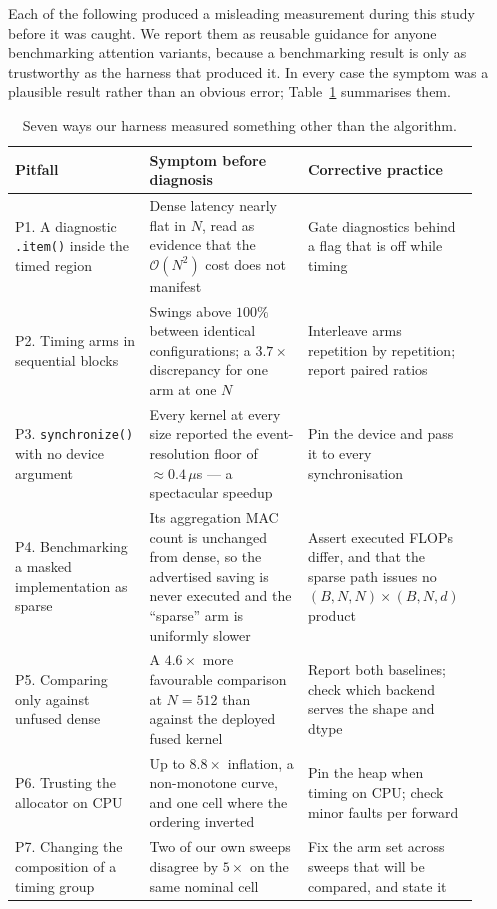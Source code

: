 Each of the following produced a misleading measurement during this study
before it was
caught. We report them as reusable guidance for anyone benchmarking attention
variants, because a benchmarking result is only as trustworthy as the harness
that produced it. In every case the symptom was a plausible result rather than
an obvious error; Table~\ref{tab:pitfalls} summarises them.

\begin{table}[t]
\centering
\small
\caption{Seven ways our harness measured something other than the algorithm.}
\label{tab:pitfalls}
\begin{tabular}{p{0.29\linewidth}p{0.33\linewidth}p{0.30\linewidth}}
\toprule
\textbf{Pitfall} & \textbf{Symptom before diagnosis} & \textbf{Corrective practice} \\
\midrule
P1. A diagnostic \texttt{.item()} inside the timed region &
Dense latency nearly flat in $N$, read as evidence that the
$\mathcal{O}(N^2)$ cost does not manifest &
Gate diagnostics behind a flag that is off while timing \\
\addlinespace
P2. Timing arms in sequential blocks &
Swings above $100\%$ between identical configurations; a $3.7\times$
discrepancy for one arm at one $N$ &
Interleave arms repetition by repetition; report paired ratios \\
\addlinespace
P3. \texttt{synchronize()} with no device argument &
Every kernel at every size reported the event-resolution floor of
$\approx0.4\,\mu$s --- a spectacular speedup &
Pin the device and pass it to every synchronisation \\
\addlinespace
P4. Benchmarking a masked implementation as sparse &
Its aggregation MAC count is unchanged from dense, so the advertised saving is
never executed and the ``sparse'' arm is uniformly slower &
Assert executed FLOPs differ, and that the sparse path issues no
$(B,N,N)\times(B,N,d)$ product \\
\addlinespace
P5. Comparing only against unfused dense &
A $4.6\times$ more favourable comparison at $N{=}512$ than against the
deployed fused kernel &
Report both baselines; check which backend serves the shape and dtype \\
\addlinespace
P6. Trusting the allocator on CPU &
Up to $8.8\times$ inflation, a non-monotone curve, and one cell where the
ordering inverted &
Pin the heap when timing on CPU; check minor faults per forward \\
\addlinespace
P7. Changing the composition of a timing group &
Two of our own sweeps disagree by $5\times$ on the same nominal cell &
Fix the arm set across sweeps that will be compared, and state it \\
\bottomrule
\end{tabular}
\end{table}

